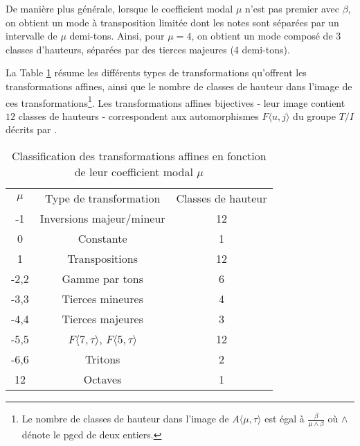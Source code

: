 De manière plus générale, lorsque le coefficient modal $\mu$ n'est pas premier avec $\beta$, on obtient un mode à transposition limitée dont les notes sont séparées par un intervalle de $\mu$ demi-tons. Ainsi, pour $\mu = 4$, on obtient un mode composé de $3$ classes d'hauteurs, séparées par des tierces majeures (4 demi-tons).


La Table \ref{tab:classmu} résume les différents types de transformations qu'offrent les transformations affines, ainsi que le nombre de classes de hauteur dans l'image de ces transformations\footnote{Le nombre de classes de hauteur dans l'image de $A\langle \mu, \tau\rangle$ est égal à $\frac{\beta}{\mu\wedge \beta}$ où $\wedge$ dénote le pgcd de deux entiers.}. Les transformations affines bijectives - leur image contient $12$ classes de hauteurs - correspondent  aux automorphismes $F\langle u,j \rangle$ du groupe $T/I$ décrits par \cite{lewin1990klumpenhouwer}.


\begin{table}[htbp]
  \centering
  \begin{tabular}{ccc}
    \rowcolor{gray!50}
    $\mu$ & Type de transformation & Classes de hauteur\\
    -1 & Inversions majeur/mineur & 12\\
    0 & Constante & 1\\
    1 & Transpositions & 12 \\
    -2,2 & Gamme par tons & 6 \\
    -3,3 & Tierces mineures &4 \\
    -4,4 & Tierces majeures & 3\\
    -5,5 & $F\langle 7,\tau \rangle$, $F\langle 5,\tau \rangle$& 12 \\
    -6,6 & Tritons & 2\\
    12 & Octaves & 1 
  \end{tabular}
  \caption{Classification des transformations affines en fonction de leur coefficient modal $\mu$\label{tab:classmu} } 
\end{table}

